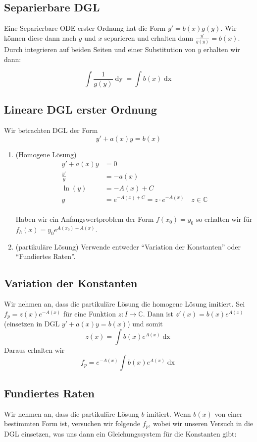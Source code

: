 \documentclass[a4paper,10pt]{article}
\def\C{\mathbb{C}}
\def\dx{\mathop{dx}}
\def\dy{\mathop{dy}}
\begin{document}
\subsection{Separierbare DGL}

Eine Separierbare ODE erster Ordnung hat die Form $y' = b(x) g(y)$. Wir können diese dann nach $y$ und $x$ separieren und erhalten dann $\frac{y'}{g(y)} = b(x)$. Durch integrieren auf beiden Seiten und einer Substitution von $y$ erhalten wir dann:

$$\int \frac{1}{g(y)} \dy = \int b(x) \dx$$

\subsection{Lineare DGL erster Ordnung}
Wir betrachten DGL der Form \[y' + a(x)y = b(x)\]
\begin{enumerate}
  \item (Homogene Lösung) 
  \begin{align*}
    y' + a(x)y &= 0\\
    \frac{y'}{y} &= -a(x)\\
    \ln(y) &= -A(x)+C\\
    y &= e^{-A(x)+C} = z \cdot e^{-A(x)}\quad z \in \C
  \end{align*}\\
  Haben wir ein Anfangswertproblem der Form $f(x_0) = y_0$ so erhalten wir für $f_h(x) = y_0 e^{A(x_0) - A(x)}$.
  \item (partikuläre Lösung) Verwende entweder ``Variation der Konstanten'' oder ``Fundiertes Raten''.
\end{enumerate}
\subsection{Variation der Konstanten}
Wir nehmen an, dass die partikuläre Lösung die homogene Lösung imitiert. Sei \(f_p = z(x)e^{-A(x)}\) für eine Funktion \(z: I \to \C\). Dann ist \(z'(x) = b(x) e^{A(x)}\) (einsetzen in DGL $y' + a(x)y = b(x)$) und somit \[z(x) = \int b(x) e^{A(x)} \mathop{dx}\] Daraus erhalten wir \[f_p = e^{-A(x)} \int b(x) e^{A(x)} \mathop{dx}\]

\subsection{Fundiertes Raten}

Wir nehmen an, dass die partikuläre Lösung $b$ imitiert. Wenn $b(x)$ von einer bestimmten Form ist, versuchen wir folgende $f_p$, wobei wir unseren Versuch in die DGL einsetzen, was uns dann ein Gleichungssystem für die Konstanten gibt:
\end{document}
